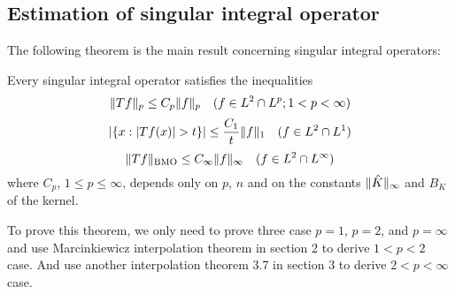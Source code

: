 \subsection{Estimation of singular integral operator}
The following theorem is the main result concerning singular integral operators:
\begin{theorem}
    Every singular integral operator satisfies the inequalities
    \begin{equation}
        \lVert Tf\rVert_p\leq C_p\lVert f\rVert_p\quad (f\in L^2\cap L^p;1<p<\infty)
    \end{equation}
    \begin{equation}\label{ieq: case p=1}
        \left\lvert\{x:\left\lvert Tf(x)\right\rvert>t\}\right\rvert\leq \frac{C_1}{t}\lVert f\rVert_1\quad (f\in L^2\cap L^1)
    \end{equation}
    \begin{equation}\label{ieq: case p=infty}
        \lVert Tf\rVert_{\operatorname{BMO}}\leq C_\infty\lVert f\rVert_\infty\quad (f\in L^2\cap L^\infty)
    \end{equation}
    where $C_p$, $1\leq p\leq\infty$, depends only on $p$, $n$ and on the constants $\lVert\hat{K}\rVert_\infty$ and $B_K$ of the kernel.
\end{theorem}
To prove this theorem, we only need to prove three case $p=1$, $p=2$, and $p=\infty$ and use Marcinkiewicz interpolation theorem in section 2 to derive $1< p<2$ case. And use another interpolation theorem 3.7 in section 3 to derive $2< p<\infty$ case.\par
